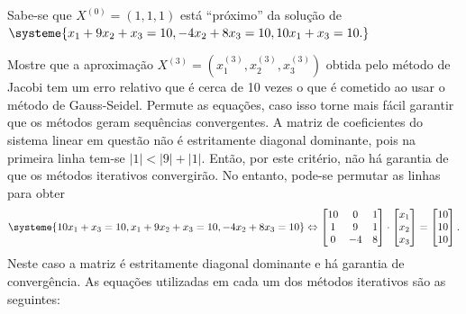\documentclass[12pt,a4paper]{article}
\begin{document}
\begin{ExerciseList}
\Exercise[title={5,0}]
Sabe-se que $X^{(0)} = (1,1,1)$ está ``próximo'' da solução de $
\systeme{
  x_1 + 9x_2 +  x_3 = 10,
       -4x_2 + 8x_3 = 10,
10x_1        +  x_3 = 10.
}
$

Mostre que a aproximação $X^{(3)} = (x_1^{(3)}, x_2^{(3)}, x_3^{(3)})$ obtida pelo método de Jacobi tem um erro relativo que é cerca de 10 vezes o que é cometido ao usar o método de Gauss-Seidel. Permute as equações, caso isso torne mais fácil garantir que os métodos geram sequências convergentes.
\Answer A matriz de coeficientes do sistema linear em questão não é  estritamente diagonal dominante, pois na primeira linha tem-se  $|1| < |9| + |1|$. Então, por este critério, não há garantia de que os métodos iterativos convergirão. No entanto, pode-se permutar as linhas para obter
\[
\systeme{
10x_1        +  x_3 = 10,
  x_1 + 9x_2 +  x_3 = 10,
       -4x_2 + 8x_3 = 10
}
\Leftrightarrow
\begin{bmatrix}
10 &  0 & 1 \\
 1 &  9 & 1 \\
 0 & -4 & 8 \\
\end{bmatrix}
\cdot
\begin{bmatrix}
x_1 \\ x_2 \\ x_3
\end{bmatrix}
=
\begin{bmatrix}
10 \\ 10 \\ 10
\end{bmatrix}.
\]
Neste caso a matriz é estritamente diagonal dominante e há garantia de convergência. As equações utilizadas em cada um dos métodos iterativos são as seguintes:


\end{ExerciseList}
\end{document}
